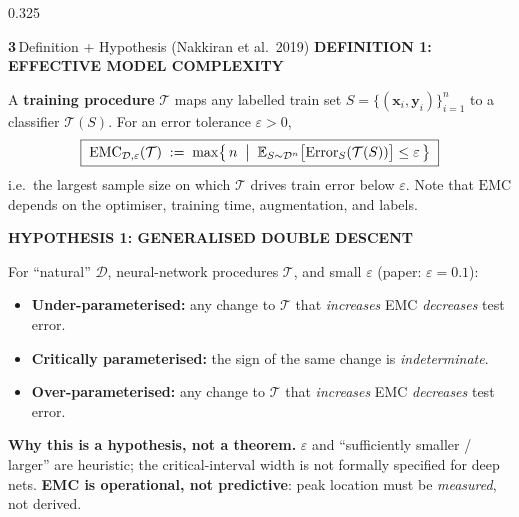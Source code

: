 \documentclass[final]{beamer}
\newcommand{\sectnum}[1]{\textcolor{accentgold}{\bfseries #1}\,}
\newcommand{\kw}[1]{\textcolor{uompurple}{\textbf{#1}}}
\newcommand{\eyebrow}[1]{{\color{uompurple}\scriptsize\bfseries\MakeUppercase{#1}}\par\vspace{-0.2ex}}
\newcommand{\chip}[2]{\textcolor{white}{\colorbox{#1}{\strut~\bfseries\small #2~}}}
\newcommand{\E}{\mathbb{E}}
\newcommand{\T}{\mathcal{T}}
\newcommand{\D}{\mathcal{D}}
\newcommand{\HypBox}[1]{%
  \par\noindent\colorbox{uompurplePale}{\parbox{\linewidth-2\fboxsep}{\footnotesize #1}}}
\begin{document}
\begin{frame}[t]{}
\begin{columns}[T,onlytextwidth]
\begin{column}{0.325\linewidth}
\begin{block}{\sectnum{3}Definition + Hypothesis (Nakkiran et al.\ 2019)}
\eyebrow{Definition 1: Effective Model Complexity}
A \kw{training procedure} \(\T\) maps any labelled train set \(S = \{(\bm{x}_i,\bm{y}_i)\}_{i=1}^{n}\) to a classifier \(\T(S)\). For an error tolerance \(\varepsilon>0\),
\[\boxed{\;\mathrm{EMC}_{\D,\varepsilon}(\T)\;:=\;\max\bigl\{\,n\;\bigm|\;\E_{S\sim\D^{n}}\bigl[\mathrm{Error}_{S}(\T(S))\bigr]\le\varepsilon\,\bigr\}\;}\]
i.e.\ the largest sample size on which \(\T\) drives train error below \(\varepsilon\). Note that \(\mathrm{EMC}\) depends on the optimiser, training time, augmentation, and labels.

\vspace{0.3ex}
\eyebrow{Hypothesis 1: Generalised Double Descent}
For ``natural'' \(\D\), neural-network procedures \(\T\), and small \(\varepsilon\) (paper: \(\varepsilon=0.1\)):
\begin{itemize}\setlength\itemsep{0.2ex}
\item[\chip{accentteal}{$\mathrm{EMC}\!\ll\! n$}] \kw{Under-parameterised:} any change to \(\T\) that \emph{increases} EMC \emph{decreases} test error.
\item[\chip{accentcoral}{$\mathrm{EMC}\!\approx\! n$}] \kw{Critically parameterised:} the sign of the same change is \emph{indeterminate}.
\item[\chip{accentgreen}{$\mathrm{EMC}\!\gg\! n$}] \kw{Over-parameterised:} any change to \(\T\) that \emph{increases} EMC \emph{decreases} test error.
\end{itemize}

\HypBox{\textbf{Why this is a hypothesis, not a theorem.} \(\varepsilon\) and ``sufficiently smaller / larger'' are heuristic; the critical-interval width is not formally specified for deep nets. \kw{EMC is operational, not predictive}: peak location must be \emph{measured}, not derived.}
\end{block}
\end{column}\hspace{0.005\linewidth}%


\end{columns}
\end{frame}
\end{document}

